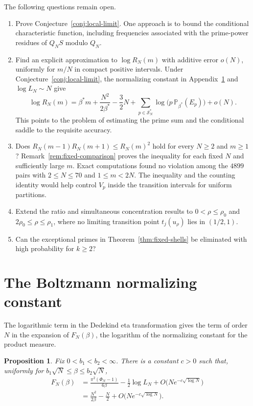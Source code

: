 \documentclass[11pt]{amsart}
\newtheorem{proposition}[theorem]{Proposition}
\theoremstyle{remark}
\newcommand{\Pp}{\mathbb P}
\begin{document}
The following questions remain open.
\begin{enumerate}
\item Prove Conjecture~\ref{conj:local-limit}. One approach is to bound the
conditional characteristic function, including frequencies associated
with the prime-power residues of \(Q_NS\) modulo \(Q_N\).
\item Find an explicit approximation to \(\log R_N(m)\) with additive
error \(o(N)\), uniformly for \(m/N\) in compact positive intervals.
Under Conjecture~\ref{conj:local-limit}, the normalizing constant in
Appendix~\ref{sec:free-energy} and \(\log L_N\sim N\) give
\[
 \log R_N(m)
 =\beta^\ast m+\frac{N^2}{2\beta^\ast}-\frac32N
   +\sum_{p\in\mathcal S_N^\ast}\log\!\bigl(p\,\Pp_{\beta^\ast}(E_p)\bigr)
   +o(N).
\]
This points to the problem of estimating the prime sum and the
conditional saddle to the requisite accuracy.
\item Does \(R_N(m-1)R_N(m+1)\le R_N(m)^2\) hold for every \(N\ge2\) and
\(m\ge1\)? Remark~\ref{rem:fixed-comparison} proves the inequality for
each fixed \(N\) and sufficiently large \(m\). Exact computations found
no violation among the \(4899\) pairs with \(2\le N\le70\) and
\(1\le m<2N\). The inequality and the counting identity would help
control \(V_p\) inside the transition intervals for uniform partitions.
\item Extend the ratio and simultaneous concentration results to
\(0<\rho\le\rho_0\) and \(2\rho_0\le\rho\le\rho_1\), where no limiting
transition point \(t_j(u_\rho)\) lies in \((1/2,1)\).
\item Can the exceptional primes in Theorem~\ref{thm:fixed-shells} be eliminated with high probability for \(k\ge2\)?
\end{enumerate}

\appendix

\section{The Boltzmann normalizing constant}\label{sec:free-energy}

The logarithmic term in the Dedekind eta transformation gives the term of order \(N\) in the expansion of \(F_N(\beta)\), the logarithm of the normalizing constant for the product measure.

\begin{proposition}\label{prop:free-energy-refined}
Fix $0<b_1<b_2<\infty$. There is a constant $c>0$ such that, uniformly for $b_1\sqrt N\le\beta\le b_2\sqrt N$,
\begin{align*}
 F_N(\beta)&=\frac{\pi^2(\Phi_N-1)}{6\beta}-\frac12\log L_N
                  +O\bigl(N e^{-c\sqrt{\log N}}\bigr)\\
            &=\frac{N^2}{2\beta}-\frac N2+O\bigl(N e^{-c\sqrt{\log N}}\bigr).
\end{align*}
\end{proposition}
\end{document}
